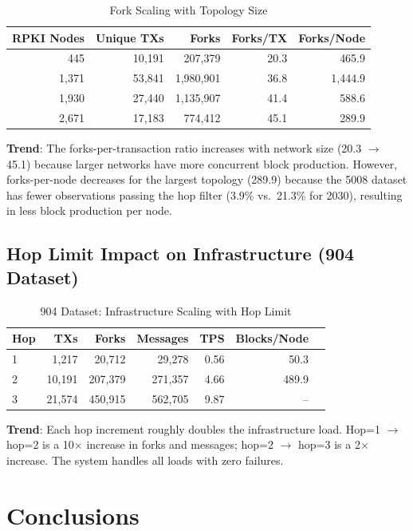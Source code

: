 \documentclass[11pt,a4paper]{article}
\begin{document}
\begin{table}[H]
\centering
\caption{Fork Scaling with Topology Size}
\begin{tabular}{rrrrr}
\toprule
\textbf{RPKI Nodes} & \textbf{Unique TXs} & \textbf{Forks} & \textbf{Forks/TX} & \textbf{Forks/Node} \\
\midrule
445   & 10,191  & 207,379   & 20.3 & 465.9 \\
1,371 & 53,841  & 1,980,901 & 36.8 & 1,444.9 \\
1,930 & 27,440  & 1,135,907 & 41.4 & 588.6 \\
2,671 & 17,183  & 774,412   & 45.1 & 289.9 \\
\bottomrule
\end{tabular}
\end{table}

\textbf{Trend}: The forks-per-transaction ratio increases with network size
(20.3 $\to$ 45.1) because larger networks have more concurrent block production.
However, forks-per-node decreases for the largest topology (289.9) because
the 5008 dataset has fewer observations passing the hop filter (3.9\% vs.\ 21.3\%
for 2030), resulting in less block production per node.

\subsection{Hop Limit Impact on Infrastructure (904 Dataset)}

\begin{table}[H]
\centering
\caption{904 Dataset: Infrastructure Scaling with Hop Limit}
\begin{tabular}{lrrrrrr}
\toprule
\textbf{Hop} & \textbf{TXs} & \textbf{Forks} & \textbf{Messages} & \textbf{TPS} & \textbf{Blocks/Node} \\
\midrule
1 & 1,217   & 20,712    & 29,278     & 0.56  & 50.3 \\
2 & 10,191  & 207,379   & 271,357    & 4.66  & 489.9 \\
3 & 21,574  & 450,915   & 562,705    & 9.87  & -- \\
\bottomrule
\end{tabular}
\end{table}

\textbf{Trend}: Each hop increment roughly doubles the infrastructure load.
Hop=1 $\to$ hop=2 is a 10$\times$ increase in forks and messages; hop=2 $\to$ hop=3
is a 2$\times$ increase. The system handles all loads with zero failures.

\section{Conclusions}
\end{document}
